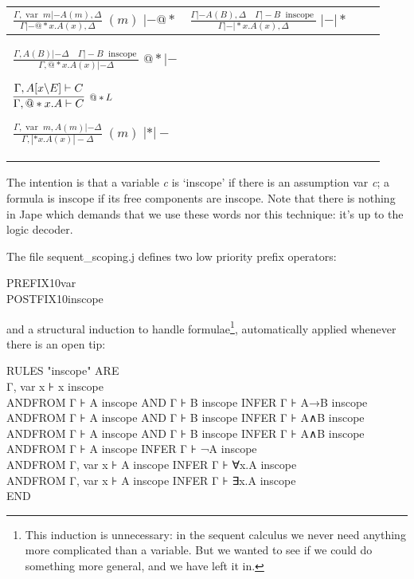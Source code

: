 \documentclass[11pt]{book}
\newcommand{\tab}{\hspace{5mm}}
\newcommand{\reason}[1]{\scalebox{0.85}{#1}}
\begin{document}
\begin{tabular}{|p{2.216in}|p{2.198in}|p{0.043in}|p{0.043in}|}
\hline
{\raggedright 
$\frac{\Gamma,\operatorname{var} \;m |- A\left( m\right),\Delta }{\Gamma |- @*x.A\left( x\right),\Delta } \;(m)\; |- @*$
} & 
{\raggedright 
$\frac{\Gamma  |- A\left( B\right),\Delta \quad \Gamma |- B\;\operatorname{inscope}}{\Gamma  |-|*x.A\left( x\right) ,\Delta } \; |-|*$
}\\
\hline
{\raggedright 
$\frac{\Gamma,A\left( B\right)  |- \Delta \quad \Gamma |- B\;\operatorname{inscope}}{\Gamma,@*x.A\left( x\right) |- \Delta } \;@*|- $

$\infer[\reason{$@*L$}]
       {\Gamma,@*x.A |- C}
       {\Gamma,A[x\backslash E] |- C}$

$\frac{\Gamma,\operatorname{var} \;m,A\left( m\right)  |- \Delta }{\Gamma ,|*x.A\left( x\right)  |- \Delta } \;(m)\;|*|- $
}\\
\hline
\end{tabular}


The intention is that a variable \textit{c} is `inscope' if there is an assumption var \textit{c}; a formula is inscope if its free components are inscope. Note that there is nothing in Jape which demands that we use these words nor this technique: it's up to the logic decoder.


The file sequent\_scoping.j defines two low priority prefix operators:

PREFIX\tab 10\tab var\\
POSTFIX\tab 10\tab inscope


and a structural induction to handle formulae\footnote{This induction is unnecessary: in the sequent calculus we never need anything more complicated than a variable. But we wanted to see if we could do something more general, and we have left it in.}, automatically applied whenever there is an open tip:

RULES "inscope" ARE\\
\tab Γ, var x ⊦ x inscope\\
AND\tab FROM Γ ⊦ A inscope AND Γ ⊦ B inscope INFER Γ ⊦ 
A→B inscope\\
AND\tab FROM Γ ⊦ A inscope AND Γ ⊦ B inscope INFER Γ ⊦ 
A∧B inscope\\
AND\tab FROM Γ ⊦ A inscope AND Γ ⊦ B inscope INFER Γ ⊦ 
A∧B inscope\\
AND\tab FROM Γ ⊦ A inscope INFER Γ ⊦ ¬A inscope\\
AND\tab FROM Γ, var x ⊦ A inscope INFER Γ ⊦ ∀x.A inscope\\
AND\tab FROM Γ, var x ⊦ A inscope INFER Γ ⊦ ∃x.A 
inscope \\
END
\end{document}
